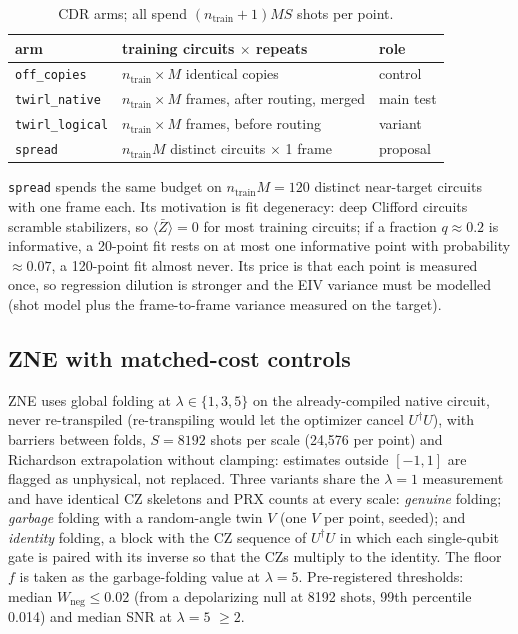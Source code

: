 \documentclass[conference]{IEEEtran}
\newcommand{\ev}[1]{\langle #1\rangle}
\newcommand{\arm}[1]{\texttt{#1}}
\begin{document}
\begin{table}[t]
\caption{CDR arms; all spend $(n_{\text{train}}+1)MS$ shots per point.}
\label{tab:arms}
\centering\footnotesize
\begin{tabular}{@{}lll@{}}
\toprule
arm & training circuits $\times$ repeats & role \\
\midrule
\arm{off\_copies} & $n_{\text{train}}\times M$ identical copies & control \\
\arm{twirl\_native} & $n_{\text{train}}\times M$ frames, after routing, merged & main test \\
\arm{twirl\_logical} & $n_{\text{train}}\times M$ frames, before routing & variant \\
\arm{spread} & $n_{\text{train}}M$ distinct circuits $\times$ 1 frame & proposal \\
\bottomrule
\end{tabular}
\end{table}

\arm{spread} spends the same budget on $n_{\text{train}}M=120$ distinct near-target circuits with
one frame each. Its motivation is fit degeneracy: deep Clifford circuits scramble stabilizers,
so $\ev{\bar Z}=0$ for most training circuits; if a fraction $q\approx0.2$ is informative, a
20-point fit rests on at most one informative point with probability $\approx0.07$, a 120-point
fit almost never. Its price is that each point is measured once, so regression dilution is
stronger and the EIV variance must be modelled (shot model plus the frame-to-frame variance
measured on the target).

\subsection{ZNE with matched-cost controls}
ZNE uses global folding at $\lambda\in\{1,3,5\}$ on the already-compiled native circuit, never
re-transpiled (re-transpiling would let the optimizer cancel $U^\dagger U$), with barriers
between folds, $S=8192$ shots per scale (24,576 per point) and Richardson extrapolation
without clamping: estimates outside $[-1,1]$ are flagged as unphysical, not replaced. Three
variants share the $\lambda=1$ measurement and have identical CZ skeletons and PRX counts at
every scale: \emph{genuine} folding; \emph{garbage} folding with a random-angle twin $V$ (one
$V$ per point, seeded); and \emph{identity} folding, a block with the CZ sequence of
$U^\dagger U$ in which each single-qubit gate is paired with its inverse so that the CZs
multiply to the identity. The floor $f$ is taken as the garbage-folding value at
$\lambda=5$. Pre-registered thresholds: median $W_{\text{neg}}\le0.02$ (from a depolarizing
null at 8192 shots, 99th percentile 0.014) and median SNR at $\lambda=5$ $\ge2$.
\end{document}
